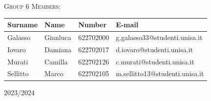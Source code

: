 \begin{titlepage}
    \textsc{Group 6 Members:}\\
    \begin{table}[h!]
        \centering
        \begin{tabular}{| m{3cm} | m{3cm} | m{3cm} | m{6cm} |}
        \hline
        \textbf{Surname} & \textbf{Name} & \textbf{Number} & \textbf{E-mail} \\ 
        \hline
        Galasso & Gianluca & 622702000 & g.galasso33@studenti.unisa.it \\ 
        \hline
        Iovaro & Damiana & 622702017 & d.iovaro@studenti.unisa.it \\ 
        \hline
        Murati & Camilla & 622702126 & c.murati@studenti.unisa.it \\ 
        \hline
        Sellitto & Marco & 622702105 & m.sellitto13@studenti.unisa.it \\ 
        \hline
        \end{tabular}
        \label{table:1}
    \end{table}

    \vfill

    {\centering \Large 2023/2024}

\end{titlepage}
